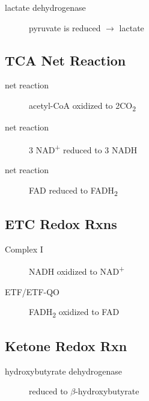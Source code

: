 \documentclass[12pt]{scrartcl}
\begin{document}

\begin{description}
\item[{lactate dehydrogenase}] pyruvate is reduced \(\to\) lactate
\end{description}


\subsection{TCA Net Reaction}
\label{sec:org81550d4}
\begin{description}
\item[{net reaction}] acetyl-CoA oxidized to 2CO\textsubscript{2}
\item[{net reaction}] 3 NAD\textsuperscript{+} reduced to 3 NADH
\item[{net reaction}] FAD reduced to FADH\textsubscript{2}
\end{description}
{\tiny{}}

\subsection{ETC Redox Rxns}
\label{sec:org5cb97b5}
\begin{description}
\item[{Complex I}] NADH oxidized to NAD\textsuperscript{+}
\end{description}


\begin{description}
\item[{ETF/ETF-QO}] FADH\textsubscript{2} oxidized to FAD

\end{description}

\subsection{Ketone Redox Rxn}
\label{sec:orgf6aba87}
\begin{description}
\item[{hydroxybutyrate dehydrogenase}] reduced to \(\beta\)-hydroxybutyrate

\end{description}
\end{document}
